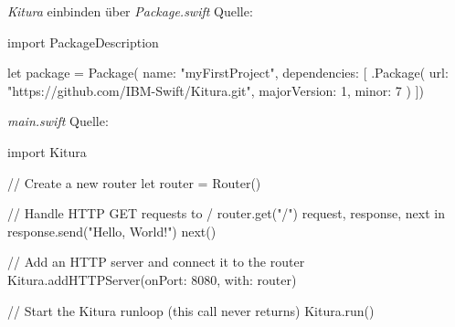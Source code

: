 \begin{listing}[H]
\caption{\textit{Kitura} einbinden über \textit{Package.swift} Quelle:\cite{Kitura}}
\label{lst:KituraInstallation2}
\begin{SwiftCode}
import PackageDescription

let package = Package(
    name: "myFirstProject",
    dependencies: [
        .Package(
            url: "https://github.com/IBM-Swift/Kitura.git", 
            majorVersion: 1, 
            minor: 7
        )
    ])
\end{SwiftCode}
\end{listing}

\begin{listing}[H]
\caption{\textit{main.swift} Quelle:\cite{Kitura}}
\label{}
\begin{SwiftCode}
import Kitura

// Create a new router
let router = Router()

// Handle HTTP GET requests to /
router.get("/") {
    request, response, next in
    response.send("Hello, World!")
    next()
}

// Add an HTTP server and connect it to the router
Kitura.addHTTPServer(onPort: 8080, with: router)

// Start the Kitura runloop (this call never returns)
Kitura.run()
\end{SwiftCode}
\end{listing}


